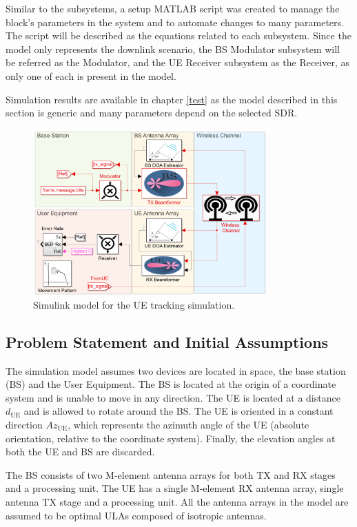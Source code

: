\documentclass[12pt,a4paper]{report}
\newcommand{\due}{d_{\text{UE}}}
\newcommand{\Azue}{Az_{\text{UE}}}
\begin{document}
Similar to the subsystems, a setup MATLAB script was created to manage the block's parameters in the system and to automate changes to many parameters. The script will be described as the equations related to each subsystem. Since the model only represents the downlink scenario, the BS Modulator subsystem will be referred as the Modulator, and the UE Receiver subsystem as the Receiver, as only one of each is present in the model.

Simulation results are available in chapter \ref{test} as the model described in this section is generic and many parameters depend on the selected SDR.

\begin{figure}[h]
    \centering
    \includegraphics[width = 0.8\textwidth]{Figures/sim_model.png}
    \caption{Simulink model for the UE tracking simulation.}
    \label{fig:sim}
\end{figure}

\subsection{Problem Statement and Initial Assumptions} \label{met:problem}
The simulation model assumes two devices are located in space, the base station (BS) and the User Equipment. The BS is located at the origin of a coordinate system and is unable to move in any direction. The UE is located at a distance $\due$ and is allowed to rotate around the BS. The UE is oriented in a constant direction $\Azue$, which represents the azimuth angle of the UE (absolute orientation, relative to the coordinate system). Finally, the elevation angles at both the UE and BS are discarded.

The BS consists of two M-element antenna arrays for both TX and RX stages and a processing unit. The UE has a single M-element RX antenna array, single antenna TX stage and a processing unit. All the antenna arrays in the model are assumed to be optimal ULAs composed of isotropic antennas.
\end{document}
